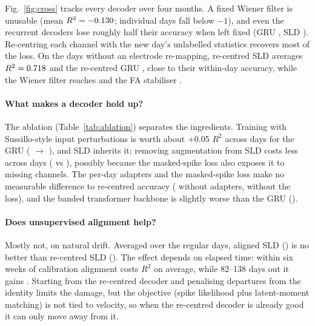 Fig.~\ref{fig:cross} tracks every decoder over four months. A fixed Wiener filter is unusable
(mean $R^2=-0.130$; individual days fall below $-1$), and even the recurrent decoders
lose roughly half their accuracy when left fixed (GRU \allGruFixed, SLD \allSldFixed). Re-centring
each channel with the new day's unlabelled statistics recovers most of the loss. On the
\nKeep{} days without an electrode re-mapping, re-centred SLD averages
$R^2=0.718$ and the re-centred GRU \keepGruRc, close to their within-day accuracy, while the
Wiener filter reaches \keepWienerRc{} and the FA stabiliser \keepFaAligned.

\paragraph{What makes a decoder hold up?} The ablation (Table~\ref{tab:ablation}) separates
the ingredients. Training with Sussillo-style input perturbations is worth about
+0.05 $R^2$ across days for the GRU (\keepGruRc{} $\to$ \keepGruAugRc), and SLD inherits it;
removing augmentation from SLD costs less across days (\keepSldNoAugRc{} vs \keepSldRc), possibly
because the masked-spike loss also exposes it to missing channels. The per-day adapters and the
masked-spike loss make no measurable difference to re-centred accuracy
(\keepSldNoAdaptersRc{} without adapters, \keepSldNoSslRc{} without the loss), and the banded
transformer backbone is slightly worse than the GRU (\keepSldTransformerRc).

\paragraph{Does unsupervised alignment help?} Mostly not, on natural drift. Averaged over
the \nKeep{} regular days, aligned SLD (\keepSldAligned) is no better than re-centred SLD (\keepSldRc).
The effect depends on elapsed time: within six weeks of calibration alignment costs
\alignGainEarly{} $R^2$ on average, while 82--138 days out it gains \alignGainLate. Starting from
the re-centred decoder and penalising departures from the identity limits the damage, but the
objective (spike likelihood plus latent-moment matching) is not tied to velocity, so when the
re-centred decoder is already good it can only move away from it.

\begin{table}[t]
\centering
\caption{Ablations (velocity $R^2$). Within-day: test blocks of the calibration days. Cross-day
means exclude the two re-mapping days; aligned variants of single-seed ablations were run on a
7-day subset (days \ablSubsetDays), so the last two columns compare all models on that subset.}
\label{tab:ablation}
\small

\end{table}

